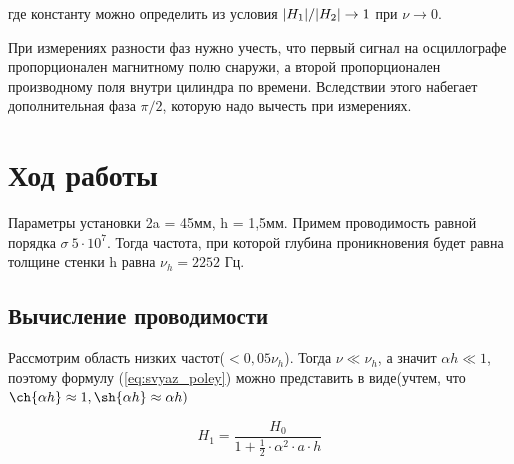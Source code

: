 \documentclass[a4paper,12pt]{article}
\begin{document}
где константу можно определить из условия $\abs{H_1}/\abs{H_2} \rightarrow 1$ при
$\nu \rightarrow 0$.

\vspace{0.3cm}

При измерениях разности фаз нужно учесть, что первый сигнал на осциллографе
пропорционален магнитному полю снаружи, а второй пропорционален производному
поля внутри цилиндра по времени. Вследствии этого набегает дополнительная фаза $\pi/2$,
которую надо вычесть при измерениях.

\section{Ход работы}
Параметры установки 2a = 45мм, h = 1,5мм. Примем проводимость равной порядка $\sigma ~ 5 \cdot 10^7$. Тогда частота, при которой глубина проникновения будет равна толщине стенки h равна $\nu_h = 2252$ Гц.

\subsection{Вычисление проводимости}
Рассмотрим область низких частот($<0,05\nu_h$). Тогда $\nu \ll \nu_h$, а значит $\alpha h \ll 1$, поэтому формулу (\ref{eq:svyaz_poley})  можно представить в виде(учтем, что $\ch{\alpha h} \approx 1, \sh{\alpha h} \approx \alpha h)$

\begin{equation}
	H_1 = \frac{H_0}{1 + \frac{1}{2} \cdot \alpha^2 \cdot a \cdot h}
    \label{eq:svyas_poley_low_freq}
\end{equation}
\end{document}
